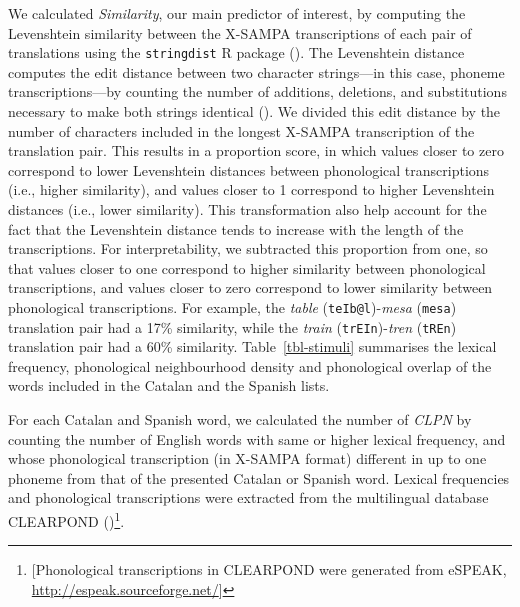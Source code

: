 \documentclass[
]{article}
\begin{document}
We calculated \emph{Similarity}, our main predictor of interest, by
computing the Levenshtein similarity between the X-SAMPA transcriptions
of each pair of translations using the \texttt{stringdist} R package
(). The Levenshtein
distance computes the edit distance between two character strings---in
this case, phoneme transcriptions---by counting the number of additions,
deletions, and substitutions necessary to make both strings identical
(). We divided
this edit distance by the number of characters included in the longest
X-SAMPA transcription of the translation pair. This results in a
proportion score, in which values closer to zero correspond to lower
Levenshtein distances between phonological transcriptions (i.e., higher
similarity), and values closer to 1 correspond to higher Levenshtein
distances (i.e., lower similarity). This transformation also help
account for the fact that the Levenshtein distance tends to increase
with the length of the transcriptions. For interpretability, we
subtracted this proportion from one, so that values closer to one
correspond to higher similarity between phonological transcriptions, and
values closer to zero correspond to lower similarity between
phonological transcriptions. For example, the \emph{table}
(\texttt{teIb@l})-\emph{mesa} (\texttt{mesa}) translation pair had a
17\% similarity, while the \emph{train} (\texttt{trEIn})-\emph{tren}
(\texttt{tREn}) translation pair had a 60\% similarity.
Table~\ref{tbl-stimuli} summarises the lexical frequency, phonological
neighbourhood density and phonological overlap of the words included in
the Catalan and the Spanish lists.

For each Catalan and Spanish word, we calculated the number of
\emph{CLPN} by counting the number of English words with same or higher
lexical frequency, and whose phonological transcription (in X-SAMPA
format) different in up to one phoneme from that of the presented
Catalan or Spanish word. Lexical frequencies and phonological
transcriptions were extracted from the multilingual database CLEARPOND
()\footnote{{[}Phonological
  transcriptions in CLEARPOND were generated from eSPEAK,
  \url{http://espeak.sourceforge.net/}{]}}.
\end{document}
